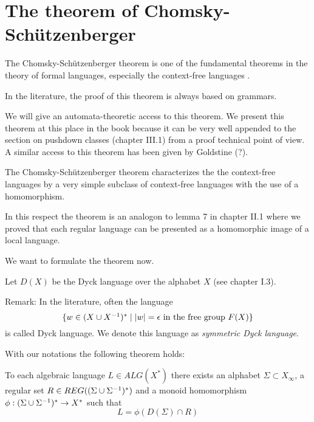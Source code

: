 \section{The theorem of Chomsky-Schützenberger}

The Chomsky-Schützenberger theorem is one of the fundamental theorems in the
theory of formal languages, especially the context-free languages \cite{ChSch}.

In the literature, the proof of this theorem is always based on grammars.

We will give an automata-theoretic access to this theorem. We present this
theorem at this place in the book because it can be very well appended to the
section on pushdown classes (chapter III.1) from a proof technical point of
view. A similar access to this theorem has been given by Goldstine
\cite{Goldstine77} (?).

The Chomsky-Schützenberger theorem characterizes the the context-free languages
by a very simple subclass of context-free languages with the use of a
homomorphism.

In this respect the theorem is an analogon to lemma 7 in chapter II.1 where we
proved that each regular language can be presented as a homomorphic image of a
local language.

We want to formulate the theorem now.

Let $D(X)$ be the Dyck language over the alphabet $X$ (see chapter I.3).

Remark: In the literature, often the language
\[ \mbox{$\{w\in (X \cup {X}^{-1})^* \mid |w|= \epsilon\text{ in the free group
}F(X)\}$} 
\] 
is called Dyck language. We denote this language as {\em symmetric Dyck
language}.

With our notations the following theorem holds:
\begin{theorem}
To each algebraic language $L\in ALG(X^*)$ there exists an alphabet $\Sigma
\subset X_\infty$, a regular set $R\in REG((\Sigma \cup {\Sigma}^{-1})^*)$ and a monoid
homomorphism $\phi: (\Sigma \cup {\Sigma}^{-1})^* \to X^*$ such that
\[ L = \phi(D(\Sigma)\cap R) \]
\end{theorem}

